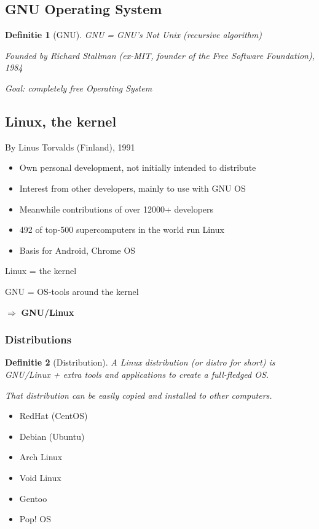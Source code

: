 \documentclass{article}
\newtheorem{theorem}{Definitie}[section]
\begin{document}
\subsection{GNU Operating System}

\begin{theorem}[GNU]
GNU = GNU's Not Unix (recursive algorithm)

Founded by Richard Stallman (ex-MIT, founder of the Free Software Foundation), 1984

Goal: completely free Operating System
\end{theorem}

\subsection{Linux, the kernel}

By Linus Torvalds (Finland), 1991

\begin{itemize}
    \item Own personal development, not initially intended to distribute
    \item Interest from other developers, mainly to use with GNU OS
    \item Meanwhile contributions of over 12000+ developers
    \item 492 of top-500 supercomputers in the world run Linux
    \item Basis for Android, Chrome OS
\end{itemize}

Linux = the kernel

GNU = OS-tools around the kernel

$\Rightarrow$ \textbf{GNU/Linux}

\subsubsection{Distributions}

\begin{theorem}[Distribution]
A Linux distribution (or distro for short) is GNU/Linux + extra tools and applications to create a full-fledged OS.

That distribution can be easily copied and installed to other computers.
\end{theorem}

\begin{itemize}
    \item RedHat (CentOS)
    \item Debian (Ubuntu)
    \item Arch Linux
    \item Void Linux
    \item Gentoo
    \item Pop! OS
\end{itemize}
\end{document}
